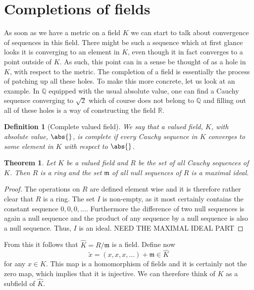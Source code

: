 \documentclass{article}
\newtheorem{theorem}{Theorem}[section]
\newtheorem{definition}{Definition}[section]
\newcommand{\mfrak}[1]{\mathfrak{#1}}
\newcommand{\mbb}[1]{\mathbb{#1}}
\begin{document}
\section{Completions of fields}
As soon as we have a metric on a field $K$ we can start to talk about convergence of sequences in this field. There might be such a sequence which at first glance looks it is converging to an element in $K$, even though it in fact converges to a point outside of $K$. As such, this point can in a sense be thought of as a hole in $K$, with respect to the metric. The completion of a field is essentially the process of patching up all these holes. To make this more concrete, let us look at an example. In $\mbb Q$ equipped with the usual absolute value, one can find a Cauchy sequence converging to $\sqrt 2$ which of course does not belong to $\mbb Q$ and filling out all of these holes is a way of constructing the field $\mbb R$.

\begin{definition}[Complete valued field]
    We say that a valued field, $K$, with absolute value, $\abs{}$, is complete if every Cauchy sequence in $K$ converges to some element in $K$ with respect to $\abs{}$.
\end{definition}

\begin{theorem}
    Let $K$ be a valued field and $R$ be the set of all Cauchy sequences of $K$. Then $R$ is a ring and the set $\mfrak m$ of all null sequences of $R$ is a maximal ideal.
\end{theorem}
\begin{proof}
    The operations on $R$ are defined element wise and it is therefore rather clear that $R$ is a ring. The set $I$ is non-empty, as it most certainly contains the constant sequence $0,0,0,...$. Furthermore the difference of two null sequences is again a null sequence and the product of any sequence by a null sequence is also a null sequence. Thus, $I$ is an ideal. NEED THE MAXIMAL IDEAL PART
\end{proof}

From this it follows that $\hat K = R / \mfrak m$ is a field. Define now $$\tilde x = (x,x,x,...) + \mfrak m \in \hat K$$ for any $x \in K$. This map is a homomorphism of fields and it is certainly not the zero map, which implies that it is injective. We can therefore think of $K$ as a subfield of $\hat K$.
\end{document}
